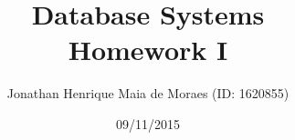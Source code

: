 \title{Database Systems \\ Homework I}
\author{Jonathan Henrique Maia de Moraes (ID: 1620855)}
\date{09/11/2015}
\maketitle